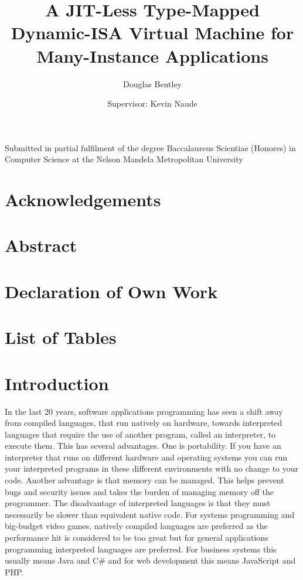 \documentclass[english,a4paper]{report}
\begin{document}
\title{A JIT-Less Type-Mapped Dynamic-ISA Virtual Machine for
  Many-Instance Applications}

\author{ Douglas Bentley \and Supervisor: Kevin Naude }

\maketitle

\begin{center}
Submitted in partial fulfilment of the degree Baccalaureus Scientiae
(Honores) in Computer Science at the Nelson Mandela Metropolitan
University
\end{center}

\newpage{}

\chapter*{Acknowledgements}

\newpage{}

\chapter*{Abstract}

\newpage{}

\chapter*{Declaration of Own Work}

\newpage{}

\listoffigures
\newpage{}

\chapter*{List of Tables}

\newpage{}

\tableofcontents
\newpage{}

\chapter{Introduction}

In the last 20 years, software applications programming has seen a
shift away from compiled languages, that run natively on hardware,
towards interpreted languages that require the use of another program,
called an interpreter, to execute them. This has several
advantages. One is portability. If you have an interpreter that runs
on different hardware and operating systems you can run your
interpreted programs in these different environments with no change to
your code. Another advantage is that memory can be managed. This helps
prevent bugs and security issues and takes the burden of managing
memory off the programmer. The disadvantage of interpreted languages
is that they must necessarily be slower than equivalent native
code. For systems programming and big-budget video games, natively
compiled languages are preferred as the performance hit is considered
to be too great but for general applications programming interpreted
languages are preferred. For business systems this usually means Java
and C\# and for web development this means JavaScript and PHP.
\end{document}
